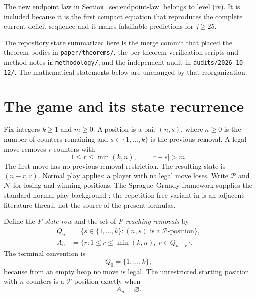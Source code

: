\documentclass[11pt]{article}
\theoremstyle{remark}
\newcommand{\Pset}{\mathcal{P}}
\newcommand{\Nset}{\mathcal{N}}
\begin{document}
The new endpoint law in Section~\ref{sec:endpoint-law} belongs to level (iv). It is included because it is the first compact equation that reproduces the complete current deficit sequence and it makes falsifiable predictions for \(j\ge25\).

The repository state summarized here is the merge commit that placed the theorem bodies in \texttt{paper/theorems/}, the per-theorem verification scripts and method notes in \texttt{methodology/}, and the independent audit in \texttt{audits/2026-10-12/}. The mathematical statements below are unchanged by that reorganization.

\section{The game and its state recurrence}\label{sec:game}

Fix integers \(k\ge1\) and \(m\ge0\). A position is a pair \((n,s)\), where \(n\ge0\) is the number of counters remaining and \(s\in\{1,\dots,k\}\) is the previous removal. A legal move removes \(r\) counters with
\begin{equation}\label{eq:moves}
1\le r\le\min(k,n),
\qquad
|r-s|>m.
\end{equation}
The first move has no previous-removal restriction. The resulting state is \((n-r,r)\). Normal play applies: a player with no legal move loses. Write \(\Pset\) and \(\Nset\) for losing and winning positions. The Sprague--Grundy framework supplies the standard normal-play background \cite{sprague1935,grundy1939,winningways2001}; the repetition-free variant in \cite{gurvich2012} is an adjacent literature thread, not the source of the present formulas.

Define the \emph{P-state row} and the set of \emph{P-reaching removals} by
\begin{align}
Q_n&=\{s\in\{1,\dots,k\}:(n,s)\text{ is a }\Pset\text{-position}\},\label{eq:Qn}\\
A_n&=\{r:1\le r\le\min(k,n),\; r\in Q_{n-r}\}.\label{eq:An}
\end{align}
The terminal convention is
\begin{equation}\label{eq:Q0}
Q_0=\{1,\dots,k\},
\end{equation}
because from an empty heap no move is legal. The unrestricted starting position with \(n\) counters is a \(\Pset\)-position exactly when
\begin{equation}\label{eq:start}
A_n=\varnothing.
\end{equation}
\end{document}
